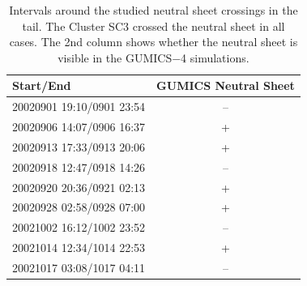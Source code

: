 \documentclass[linenumbers,draft]{agujournal}
\begin{document}
\begin{table}[h]
\setlength{\tabcolsep}{3pt}
\centering
\begin{tabular}{lc}
\hline
Start/End & GUMICS Neutral Sheet\\
\hline
20020901 19:10/0901 23:54 & -- \\
20020906 14:07/0906 16:37 & + \\
20020913 17:33/0913 20:06 & + \\
20020918 12:47/0918 14:26 & -- \\
20020920 20:36/0921 02:13 & + \\
20020928 02:58/0928 07:00 & + \\
20021002 16:12/1002 23:52 & -- \\
20021014 12:34/1014 22:53 & + \\
20021017 03:08/1017 04:11 & -- \\
\hline
\end{tabular}
\caption{Intervals around the studied neutral sheet crossings in the tail. The Cluster SC3 crossed the neutral sheet in all cases. The 2nd column shows whether the neutral sheet is visible in the GUMICS$-$4 simulations. \label{tab:ns}}
\end{table}
\end{document}
